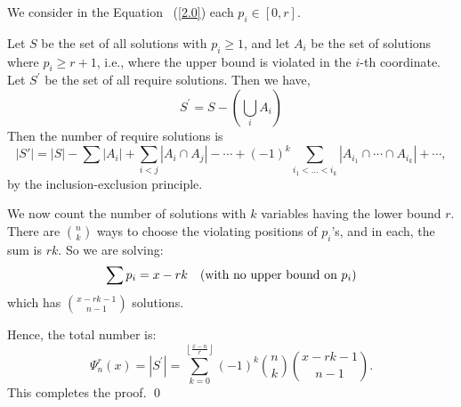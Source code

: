 \documentclass[11pt]{amsart}
\renewenvironment{proof}{{\bfseries Proof.}}{\qed}
\numberwithin{equation}{section}
\theoremstyle{definition}
\newcommand{\eqnref}[1]{~{\textrm(\ref{#1})}}
\numberwithin{equation}{section}
\begin{document}
	\begin{proof}
		We consider
		in the Equation \eqnref{2.0}  each \( p_i \in [0, r] \). 
		
		Let \( S \) be the set of all solutions with \( p_i \ge 1\), and let \( A_i \) be the set of solutions where \( p_i \ge r+1 \), i.e., where the upper bound is violated in the \( i \)-th coordinate. Let $S^{\prime}$ be the set of all require solutions. Then we have, 
		\[  S^{\prime} =S-(\bigcup_{i}A_i)  \]
		Then the number of require solutions is
		\[
		|S'| = |S| - \sum |A_i| + \sum_{i<j} |A_i \cap A_j| - \cdots + (-1)^k \sum_{i_1 < \dots < i_k} |A_{i_1} \cap \cdots \cap A_{i_k}| + \cdots,
		\]
		by the inclusion-exclusion principle.
		
		We now count the number of solutions with \( k \) variables having the lower bound $r$. There are \( \binom{n}{k} \) ways to choose the violating positions of $p_i$'s, and in each, the sum is \( rk \). So we are solving:
		\[
		\sum p_i = x - rk \quad \text{(with no upper bound on \( p_i \))}
		\]
		which has \( \binom{x - rk - 1}{n - 1} \) solutions.
		
		Hence, the total number is:
		\[
		\Psi^r_n(x) = |S^{\prime}|=\sum_{k=0}^{\left\lfloor \frac{x - n}{r} \right\rfloor} (-1)^k \binom{n}{k} \binom{x - rk - 1}{n - 1}.
		\]
		This completes the proof. 
	\end{proof}
	
\end{document}
